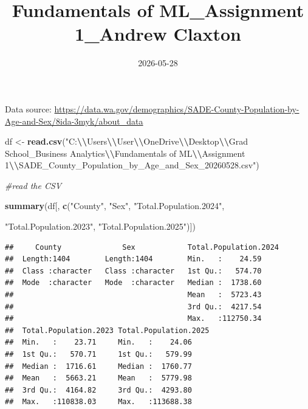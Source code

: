 \documentclass[
]{article}
\title{Fundamentals of ML\_Assignment 1\_Andrew Claxton}
\author{}
\date{\vspace{-2.5em}2026-05-28}
\newenvironment{Shaded}{\begin{snugshade}}{\end{snugshade}}
\newcommand{\CommentTok}[1]{\textcolor[rgb]{0.56,0.35,0.01}{\textit{#1}}}
\newcommand{\FunctionTok}[1]{\textcolor[rgb]{0.13,0.29,0.53}{\textbf{#1}}}
\newcommand{\NormalTok}[1]{#1}
\newcommand{\OtherTok}[1]{\textcolor[rgb]{0.56,0.35,0.01}{#1}}
\newcommand{\SpecialCharTok}[1]{\textcolor[rgb]{0.81,0.36,0.00}{\textbf{#1}}}
\newcommand{\StringTok}[1]{\textcolor[rgb]{0.31,0.60,0.02}{#1}}
\begin{document}
\maketitle

Data source:
\url{https://data.wa.gov/demographics/SADE-County-Population-by-Age-and-Sex/8ida-3myk/about_data}

\begin{Shaded}
\begin{Highlighting}[]
\NormalTok{df }\OtherTok{\textless{}{-}} \FunctionTok{read.csv}\NormalTok{(}\StringTok{"C:}\SpecialCharTok{\textbackslash{}\textbackslash{}}\StringTok{Users}\SpecialCharTok{\textbackslash{}\textbackslash{}}\StringTok{User}\SpecialCharTok{\textbackslash{}\textbackslash{}}\StringTok{OneDrive}\SpecialCharTok{\textbackslash{}\textbackslash{}}\StringTok{Desktop}\SpecialCharTok{\textbackslash{}\textbackslash{}}\StringTok{Grad School\_Business Analytics}\SpecialCharTok{\textbackslash{}\textbackslash{}}\StringTok{Fundamentals of ML}\SpecialCharTok{\textbackslash{}\textbackslash{}}\StringTok{Assignment 1}\SpecialCharTok{\textbackslash{}\textbackslash{}}\StringTok{SADE\_County\_Population\_by\_Age\_and\_Sex\_20260528.csv"}\NormalTok{)}

\CommentTok{\#read the CSV}

\FunctionTok{summary}\NormalTok{(df[, }\FunctionTok{c}\NormalTok{(}\StringTok{"County"}\NormalTok{, }\StringTok{"Sex"}\NormalTok{, }\StringTok{"Total.Population.2024"}\NormalTok{, }

               \StringTok{"Total.Population.2023"}\NormalTok{, }\StringTok{"Total.Population.2025"}\NormalTok{)])}
\end{Highlighting}
\end{Shaded}

\begin{verbatim}
##     County              Sex            Total.Population.2024
##  Length:1404        Length:1404        Min.   :    24.59    
##  Class :character   Class :character   1st Qu.:   574.70    
##  Mode  :character   Mode  :character   Median :  1738.60    
##                                        Mean   :  5723.43    
##                                        3rd Qu.:  4217.54    
##                                        Max.   :112750.34    
##  Total.Population.2023 Total.Population.2025
##  Min.   :    23.71     Min.   :    24.06    
##  1st Qu.:   570.71     1st Qu.:   579.99    
##  Median :  1716.61     Median :  1760.77    
##  Mean   :  5663.21     Mean   :  5779.98    
##  3rd Qu.:  4164.82     3rd Qu.:  4293.80    
##  Max.   :110838.03     Max.   :113688.38
\end{verbatim}
\end{document}
